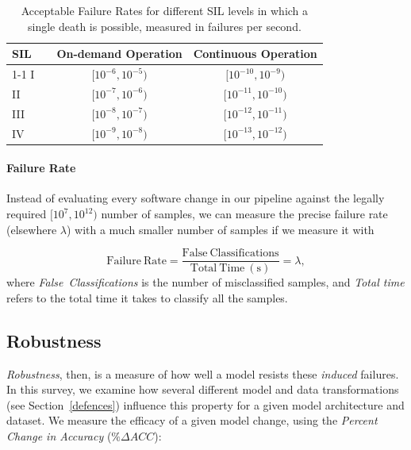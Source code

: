 \documentclass[journal]{IEEEtran}
\begin{document}
\begin{table}[!ht] %
    \begin{center}
        \caption{Acceptable Failure Rates for different SIL levels in which a single death is possible, measured in failures per second.}
        \begin{tabular}{l c cc} %
            \toprule
            SIL  && On-demand Operation   & Continuous Operation \\
            \cmidrule{1-1} \cmidrule{3-4}
            I     && $[10^{-6}, 10^{-5})$  & $[10^{-10}, 10^{-9})$ \\ %
            II    && $[10^{-7}, 10^{-6})$  & $[10^{-11}, 10^{-10})$ \\ %
            III   && $[10^{-8}, 10^{-7})$  & $[10^{-12}, 10^{-11})$ \\ %
            IV    && $[10^{-9}, 10^{-8})$  & $[10^{-13}, 10^{-12})$ \\ %
            \bottomrule
        \end{tabular}
        \label{tab:rate}
    \end{center}
\end{table}


\paragraph{Failure Rate}

Instead of evaluating every software change in our pipeline against the legally required $[10^7,10^{12})$ number of samples, we can measure the precise failure rate (elsewhere $\lambda$) with a much smaller number of samples if we measure it with



\begin{equation}\label{eq:failure_rate}
    \mathrm{Failure~Rate} = \frac{\mathrm{False~Classifications}}{\mathrm{Total ~Time~(s)}}
                          = \lambda,
\end{equation}
where \textit{False~Classifications} is the number of misclassified samples, and \textit{Total time} refers to the total time it takes to classify all the samples.


\subsection{Robustness}
\textit{Robustness}, then, is a measure of how well a model resists these \textit{induced} failures.
In this survey, we examine how several different model and data transformations (see Section~\ref{defences}) influence this property for a given model architecture and dataset.
We measure the efficacy of a given model change, using the \textit{Percent Change in Accuracy} ($\%\Delta ACC$):
\end{document}
